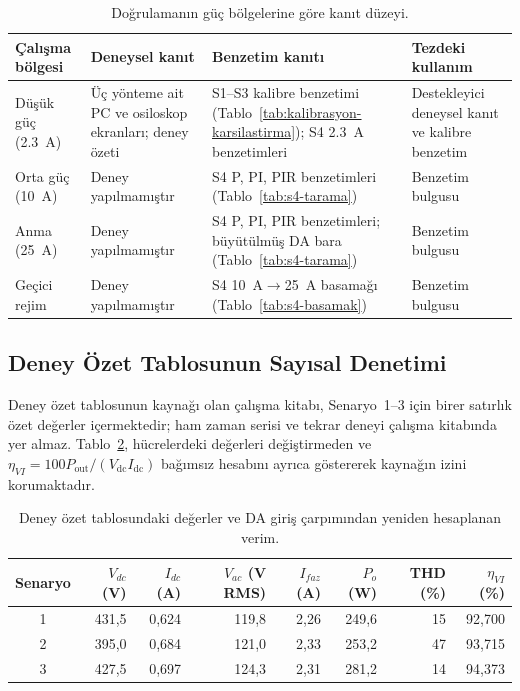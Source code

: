 \begin{table}[H]
  \centering
  \caption{Doğrulamanın güç bölgelerine göre kanıt düzeyi.}
  \label{tab:deney-juri-durum}
  \small
  \begin{tabularx}{\textwidth}{p{} X X p{}}
    \toprule
    Çalışma bölgesi & Deneysel kanıt & Benzetim kanıtı & Tezdeki kullanım \\
    \midrule
    Düşük güç (\SI{2.3}{\ampere}) & Üç yönteme ait PC ve osiloskop ekranları; deney özeti & S1--S3 kalibre benzetimi (Tablo~\ref{tab:kalibrasyon-karsilastirma}); S4 \SI{2.3}{\ampere} benzetimleri & Destekleyici deneysel kanıt ve kalibre benzetim \\
    Orta güç (\SI{10}{\ampere}) & Deney yapılmamıştır & S4 P, PI, PIR benzetimleri (Tablo~\ref{tab:s4-tarama}) & Benzetim bulgusu \\
    Anma (\SI{25}{\ampere}) & Deney yapılmamıştır & S4 P, PI, PIR benzetimleri; büyütülmüş DA bara (Tablo~\ref{tab:s4-tarama}) & Benzetim bulgusu \\
    Geçici rejim & Deney yapılmamıştır & S4 \SI{10}{\ampere}$\rightarrow$\SI{25}{\ampere} basamağı (Tablo~\ref{tab:s4-basamak}) & Benzetim bulgusu \\
    \bottomrule
  \end{tabularx}
\end{table}

\subsection{Deney Özet Tablosunun Sayısal Denetimi}

Deney özet tablosunun kaynağı olan çalışma kitabı, Senaryo~1--3 için birer satırlık özet değerler içermektedir; ham zaman serisi ve tekrar deneyi çalışma kitabında yer almaz. Tablo~\ref{tab:gelen-excel-senaryolar}, hücrelerdeki değerleri değiştirmeden ve $\eta_{VI}=100P_{\mathrm{out}}/(V_{\mathrm{dc}}I_{\mathrm{dc}})$ bağımsız hesabını ayrıca göstererek kaynağın izini korumaktadır.

\begin{table}[htbp]
  \centering
  \caption{Deney özet tablosundaki değerler ve DA giriş çarpımından yeniden hesaplanan verim.}
  \label{tab:gelen-excel-senaryolar}
  \footnotesize
  \begin{tabularx}{\textwidth}{c r r r r r r r}
    \toprule
    Senaryo & $V_{dc}$ (V) & $I_{dc}$ (A) & $V_{ac}$ (V RMS) & $I_{faz}$ (A) & $P_o$ (W) & THD (\%) & $\eta_{VI}$ (\%) \\
    \midrule
    1 & 431,5 & 0,624 & 119,8 & 2,26 & 249,6 & 15 & 92,700 \\
    2 & 395,0 & 0,684 & 121,0 & 2,33 & 253,2 & 47 & 93,715 \\
    3 & 427,5 & 0,697 & 124,3 & 2,31 & 281,2 & 14 & 94,373 \\
    \bottomrule
  \end{tabularx}
\end{table}

